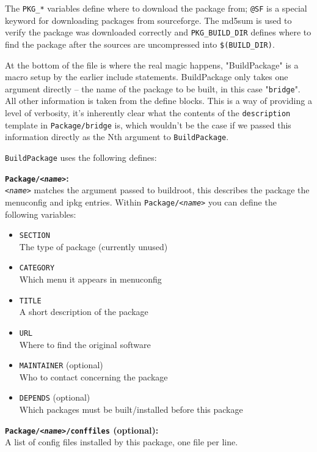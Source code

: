 The \texttt{PKG\_*} variables define where to download the package from;
\texttt{@SF} is a special keyword for downloading packages from sourceforge. 
The md5sum is used to verify the package was downloaded correctly and
\texttt{PKG\_BUILD\_DIR} defines where to find the package after the sources are
uncompressed into \texttt{\$(BUILD\_DIR)}.

At the bottom of the file is where the real magic happens, "BuildPackage" is a macro
setup by the earlier include statements. BuildPackage only takes one argument directly -- 
the name of the package to be built, in this case "\texttt{bridge}". All other information
is taken from the define blocks. This is a way of providing a level of verbosity, it's
inherently clear what the contents of the \texttt{description} template in
\texttt{Package/bridge} is, which wouldn't be the case if we passed this information
directly as the Nth argument to \texttt{BuildPackage}.

\texttt{BuildPackage} uses the following defines:

\textbf{\texttt{Package/\textit{<name>}}:} \\
	\texttt{\textit{<name>}} matches the argument passed to buildroot, this describes
	the package the menuconfig and ipkg entries. Within \texttt{Package/\textit{<name>}}
	you can define the following variables:

	\begin{itemize}
		\item \texttt{SECTION} \\
			The type of package (currently unused)
		\item \texttt{CATEGORY} \\
			Which menu it appears in menuconfig
		\item \texttt{TITLE} \\
			A short description of the package
		\item \texttt{URL} \\
			Where to find the original software
		\item \texttt{MAINTAINER} (optional) \\
			Who to contact concerning the package
		\item \texttt{DEPENDS} (optional) \\
			Which packages must be built/installed before this package
	\end{itemize}

\textbf{\texttt{Package/\textit{<name>}/conffiles} (optional):} \\
   A list of config files installed by this package, one file per line.
 
